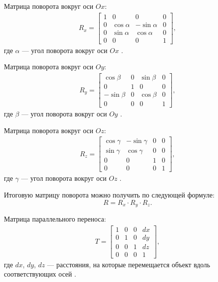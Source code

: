 Матрица поворота вокруг оси $Ox$:
\begin{equation}
\begin{gathered}
R_x = 
	\begin{bmatrix}
		1 & 0 & 0 & 0 \\
		0 & \cos{\alpha} & -\sin{\alpha} & 0 \\
		0 & \sin{\alpha} & \cos{\alpha} & 0 \\
		0 & 0 & 0 & 1
	\end{bmatrix},
\end{gathered}
\end{equation}
где $\alpha$  --- угол поворота вокруг оси $Ox$ \cite{Panov2017}.

Матрица поворота вокруг оси $Oy$:
\begin{equation}
\begin{gathered}
R_y = 
	\begin{bmatrix}
		\cos{\beta} & 0 & \sin{\beta} & 0 \\
		0 & 1 & 0 & 0 \\
		-\sin{\beta} & 0 & \cos{\beta} & 0 \\
		0 & 0 & 0 & 1
	\end{bmatrix},
\end{gathered}
\end{equation}
где $\beta$  --- угол поворота вокруг оси $Oy$ \cite{Panov2017}.

Матрица поворота вокруг оси $Oz$:
\begin{equation}
\begin{gathered}
R_z = 
	\begin{bmatrix}
		\cos{\gamma} & -\sin{\gamma} & 0 & 0 \\
		\sin{\gamma} & \cos{\gamma} & 0 & 0 \\
		0 & 0 & 1 & 0 \\
		0 & 0 & 0 & 1
	\end{bmatrix},
\end{gathered}
\end{equation}
где $\gamma$  --- угол поворота вокруг оси $Oz$ \cite{Panov2017}.

Итоговую матрицу поворота можно получить по следующей формуле:
\begin{equation}
R = R_x \cdot R_y \cdot R_z.
\end{equation}

Матрица параллельного переноса:
\begin{equation}
\begin{gathered}
T = 
	\begin{bmatrix}
		1 & 0 & 0 & dx \\
		0 & 1 & 0 & dy \\
		0 & 0 & 1 & dz \\
		0 & 0 & 0 & 1
	\end{bmatrix},
\end{gathered}
\end{equation}
где $dx$, $dy$, $dz$ --- расстояния, на которые перемещается объект вдоль соответствующих осей \cite{Panov2017}.

